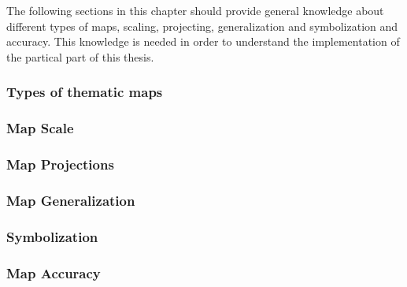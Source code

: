 The following sections in this chapter should provide general knowledge about different types of maps, scaling, projecting, generalization and symbolization and accuracy. This knowledge is needed in order to understand the implementation of the partical part of this thesis.

\subsubsection{Types of thematic maps}
\subsubsection{Map Scale}
\subsubsection{Map Projections}
\subsubsection{Map Generalization}
\subsubsection{Symbolization}
\subsubsection{Map Accuracy}
\label{s:map-accuracy}

